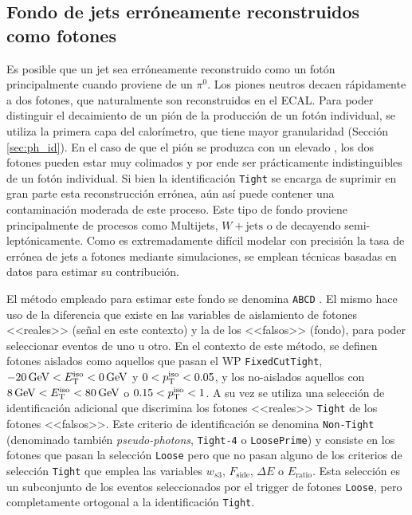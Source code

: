 \subsection{Fondo de jets erróneamente reconstruidos como fotones}\label{sec:jfakes}

Es posible que un jet sea erróneamente reconstruido como un fotón principalmente cuando proviene de un $\pi^0$. Los piones neutros decaen rápidamente a dos fotones, que naturalmente son reconstruidos en el ECAL. Para poder distinguir el decaimiento de un pión de la producción de un fotón individual, se utiliza la primera capa del calorímetro, que tiene mayor granularidad (Sección \ref{sec:ph_id}). En el caso de que el pión se produzca con un elevado \pt, los dos fotones pueden estar muy colimados y por ende ser prácticamente indistinguibles de un fotón individual. Si bien la identificación \texttt{Tight} se encarga de suprimir en gran parte esta reconstrucción errónea, aún así puede contener una contaminación moderada de este proceso. Este tipo de fondo proviene principalmente de procesos como Multijets, $W+\text{jets}$ o de \ttbar decayendo semi-leptónicamente. 
Como es extremadamente difícil modelar con precisión la tasa de errónea de jets a fotones mediante simulaciones, se emplean técnicas basadas en datos para estimar su contribución.


El método empleado para estimar este fondo se denomina \texttt{ABCD} \cite{Alonso:2233238}. El mismo hace uso de la diferencia que existe en las variables de aislamiento de fotones <<reales>> (señal en este contexto) y la de los <<falsos>> (fondo), para poder seleccionar eventos de uno u otro.
En el contexto de este método, se definen fotones aislados como aquellos que pasan el WP \texttt{FixedCutTight},
 $-20\,\text{GeV}<E_{\text{T}}^{\text{iso}}<0\,\text{GeV}$ y $0<p_{\text{T}}^{\text{iso}}<0.05$, y los no-aislados aquellos con $8\,\text{GeV}<E_{\text{T}}^{\text{iso}}<80\,\text{GeV}$ o $0.15<p_{\text{T}}^{\text{iso}}<1$.
A su vez se utiliza una selección de identificación adicional que discrimina los fotones <<reales>> \texttt{Tight} de los fotones <<falsos>>. Este criterio de identificación se denomina \texttt{Non-Tight} (denominado también \textit{pseudo-photons}, \texttt{Tight-4} o \texttt{LoosePrime}) y consiste en los fotones que pasan la selección \texttt{Loose} pero que no pasan alguno de los criterios de selección \texttt{Tight} que emplea las variables $w_{s3}$, $F_{\text{side}}$, $\Delta E$ o $E_{\text{ratio}}$. Esta selección es un subconjunto de los eventos seleccionados por el trigger de fotones \texttt{Loose}, pero completamente ortogonal a la identificación \texttt{Tight}. 

